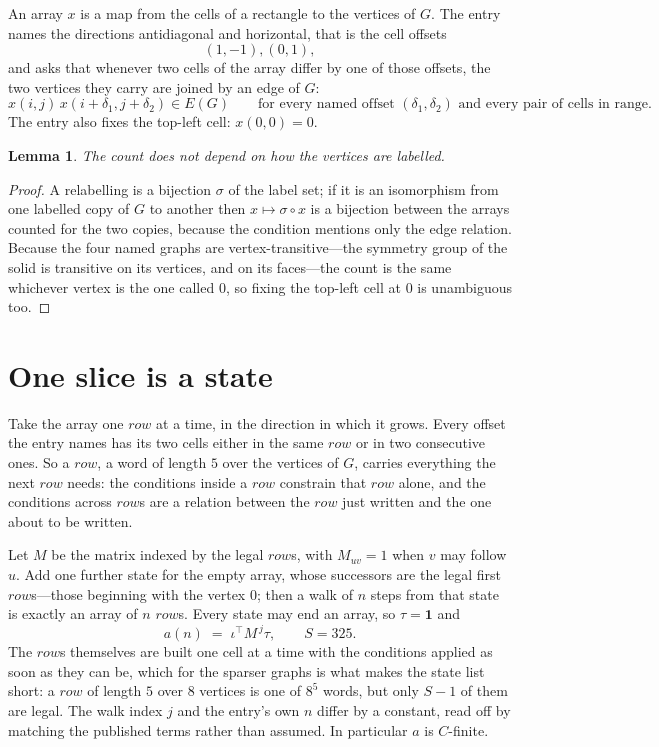 \documentclass[11pt,a4paper]{article}
\theoremstyle{plain}
\newtheorem{lemma}[theorem]{Lemma}
\theoremstyle{definition}
\begin{document}
An array $x$ is a map from the cells of a rectangle to the vertices of $G$. The entry names the
directions antidiagonal and horizontal, that is the cell offsets
\[
(1,-1), (0,1),
\]
and asks that whenever two cells of the array differ by one of those offsets, the two vertices
they carry are joined by an edge of $G$:
\[
x(i,j)\,x(i+\delta_1,j+\delta_2)\in E(G)\qquad
\text{for every named offset } (\delta_1,\delta_2)\text{ and every pair of cells in range.}
\]
The entry also fixes the top-left cell: $x(0,0)=0$.

\begin{lemma}\label{lem:label}
The count does not depend on how the vertices are labelled.
\end{lemma}

\begin{proof}
A relabelling is a bijection $\sigma$ of the label set; if it is an isomorphism from one
labelled copy of $G$ to another then $x\mapsto\sigma\circ x$ is a bijection between the arrays
counted for the two copies, because the condition mentions only the edge relation.
Because the four named graphs are vertex-transitive---the symmetry group of the solid is transitive on its vertices, and on its faces---the count is the same whichever vertex is the one called $0$, so fixing the top-left cell at $0$ is unambiguous too.
\end{proof}

\section{One slice is a state}

Take the array one $row$ at a time, in the direction in which it grows.
Every offset the entry names has its two cells either in the same $row$ or in two
consecutive ones. So a $row$, a word of length $5$ over the vertices of $G$, carries
everything the next $row$ needs: the conditions inside a $row$ constrain that
$row$ alone, and the conditions across $row$s are a relation between the
$row$ just written and the one about to be written.

Let $M$ be the matrix indexed by the legal $row$s, with $M_{uv}=1$ when $v$ may
follow $u$. Add one further state for the empty array, whose successors are the legal first
$row$s---those beginning with the vertex $0$; then a walk of
$n$ steps from that state is exactly an array of $n$ $row$s. Every state may end an
array, so $\tau=\mathbf{1}$ and
\[
a(n)\;=\;\iota^{\!\top}M^{\,j}\tau ,\qquad S=325.
\]
The $row$s themselves are built one cell at a time with the conditions applied as soon
as they can be, which for the sparser graphs is what makes the state list short: a $row$
of length $5$ over $8$ vertices is one of $8^{5}$ words, but only $S-1$ of them are
legal. The walk index $j$ and the entry's own $n$ differ by a constant, read off by matching the
published terms rather than assumed. In particular $a$ is $C$-finite.
\end{document}
